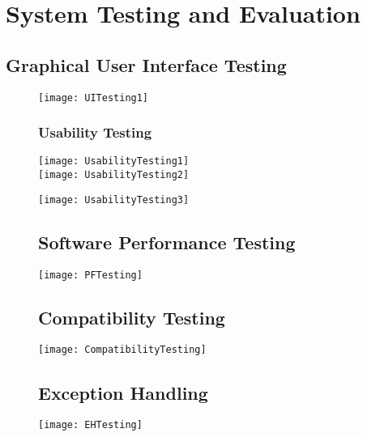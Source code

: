 \chapter{System Testing and Evaluation}\label{chap:testingEvaluation}

\section{Graphical User Interface Testing}
\begin{figure}[ht]
\centering
\texttt{[image: UITesting1]}
\end{figure}

\begin{figure}[ht]
\subsection{Usability Testing}
\centering
\texttt{[image: UsabilityTesting1]} \\
\vspace{-0.4cm}
\texttt{[image: UsabilityTesting2]}
\end{figure}

\begin{figure}
\centering
\texttt{[image: UsabilityTesting3]}
\end{figure}

\begin{figure}
\section{Software Performance Testing}
\centering
\texttt{[image: PFTesting]}
\end{figure}

\begin{figure}
\section{Compatibility Testing}
\centering
\texttt{[image: CompatibilityTesting]}
\end{figure}

\begin{figure}
\section{Exception Handling}
\centering
\texttt{[image: EHTesting]}
\end{figure}

